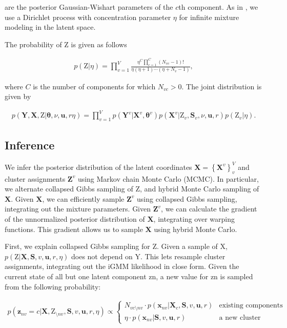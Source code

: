 \documentclass[]{article}
\newcommand{\Z}{\boldsymbol{\mathrm{Z}}}
\newcommand{\Scluster}{\mathbf{S}}
\newcommand{\setYv}{\mathbf{Y}^{v}}
\newcommand{\setY}{\mathbf{Y}}
\newcommand{\setXv}{\mathbf{X}^{v}}
\newcommand{\setZv}{\mathbf{Z}^{v}}
\newcommand{\setX}{\mathbf{X}}
\newcommand{\hParams}{\boldsymbol{\theta}}
\newcommand{\hParamsv}{\boldsymbol{\theta}^{v}}
\newcommand{\obspv}{\mathbf{x}_{nv}}
\begin{document}
are the posterior Gaussian-Wishart parameters of the
$c$th component. As in \cite{IwaDuvGha2012warped}, we use a Dirichlet process with concentration parameter $\eta$ for infinite mixture modeling in the latent space.

The probability of $\Z$ is given as follows 

\begin{align}
p\left(\Z|\eta\right) = \prod_{v=1}^{V}\frac{\eta^C \prod_{c=1}^{C}\left(N_{vc}-1\right)!}{\eta\left(\eta+1\right)\cdots\left(\eta+ N_v -1\right)},
\end{align}

where $C$ is the number of components for which $N_{vc} >
0$. The joint distribution is given by

\begin{align}
p\left(\setY,\setX,\Z|\hParams,\nu,\mathbf{u},r\eta\right) = \prod_{v=1}^{V}p\left(\setYv|\setXv,\hParamsv\right)p\left(\setXv|\Z_v,\Scluster_v , \nu,\mathbf{u},r\right)p\left(\Z_v|\eta\right).
\end{align}


\subsection{Inference}

We infer the posterior distribution of the latent coordinates
$\setX = \left\{\setXv\right\}_v^{V}$ and cluster assignments $\setZv$ using Markov
chain Monte Carlo (MCMC). In particular, we alternate
collapsed Gibbs sampling of $\Z$, and hybrid Monte
Carlo sampling of $\setX$. Given $\setX$, we can efficiently sample
$\setZv$ using collapsed Gibbs sampling, integrating out
the mixture parameters. Given $\setZv$, we can calculate the
gradient of the unnormalized posterior distribution of
$\setX$, integrating over warping functions. This gradient
allows us to sample $\setX$ using hybrid Monte Carlo.

First, we explain collapsed Gibbs sampling for Z.
Given a sample of X, $p\left(\Z|\setX,\Scluster,v,\mathbf{u},r,\eta\right)$ does not depend
on Y. This lets resample cluster assignments,
integrating out the iGMM likelihood in close form.
Given the current state of all but one latent component
zn, a new value for zn is sampled from the following
probability:

\begin{align*}
p\left(\mathbf{z}_{nv} = c| \setX,\Z_{\setminus nv},\Scluster,v,\mathbf{u},r,\eta\right) \propto \left\{\begin{array}{cc}
N_{vc\setminus{nv}}\cdot p\left(\obspv|\setX_c, \Scluster,v,\mathbf{u},r\right) & \textrm{existing components}\\
\eta\cdot p\left(\obspv|\Scluster,v,\mathbf{u},r\right) & \textrm{a new cluster}
\end{array}\right.
\end{align*} 
\end{document}
